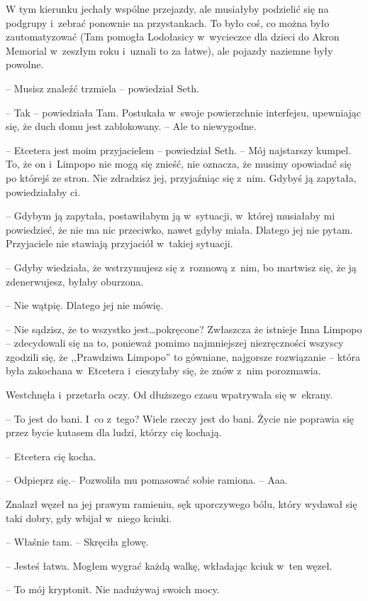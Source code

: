 \documentclass[oneside,polish,11pt,sfheadings]{mwbk}
\begin{document}
W tym kierunku jechały wspólne przejazdy, ale musiałyby podzielić się na
podgrupy i~zebrać ponownie na przystankach. To było coś, co można było
zautomatyzować (Tam pomogła Lodołasicy w~wycieczce dla dzieci do Akron
Memorial w~zeszłym roku i~uznali to za łatwe), ale pojazdy naziemne były
powolne.

-- Musisz znaleźć trzmiela -- powiedział Seth.

-- Tak -- powiedziała Tam. Postukała w~swoje powierzchnie interfejsu,
upewniając się, że duch domu jest zablokowany. -- Ale to niewygodne.

-- Etcetera jest moim przyjacielem -- powiedział Seth. -- Mój najstarszy
kumpel. To, że on i~Limpopo nie mogą się znieść, nie oznacza, że musimy
opowiadać się po którejś ze stron. Nie zdradzisz jej, przyjaźniąc się z~nim. Gdybyś ją zapytała, powiedziałaby ci.

-- Gdybym ją zapytała, postawiłabym ją w~sytuacji, w~której musiałaby mi
powiedzieć, że nie ma nic przeciwko, nawet gdyby miała. Dlatego jej nie
pytam. Przyjaciele nie stawiają przyjaciół w~takiej sytuacji.

-- Gdyby wiedziała, że wstrzymujesz się z~rozmową z~nim, bo martwisz się,
że ją zdenerwujesz, byłaby oburzona.

-- Nie wątpię. Dlatego jej nie mówię.

-- Nie sądzisz, że to wszystko jest\ldots  pokręcone? Zwłaszcza że istnieje
Inna Limpopo -- zdecydowali się na to, ponieważ pomimo najmniejszej
niezręczności wszyscy zgodzili się, że ,,Prawdziwa Limpopo'' to
gówniane, najgorsze rozwiązanie -- która była zakochana w~Etcetera i~cieszyłaby się, że znów z~nim porozmawia.

Westchnęła i~przetarła oczy. Od dłuższego czasu wpatrywała się w~ekrany.

-- To jest do bani. I~co z~tego? Wiele rzeczy jest do bani. Życie nie
poprawia się przez bycie kutasem dla ludzi, którzy cię kochają.

-- Etcetera cię kocha.

-- Odpieprz się.-- Pozwoliła mu pomasować sobie ramiona. -- Aaa.

Znalazł
węzeł na jej prawym ramieniu, sęk uporczywego bólu, który wydawał się
taki dobry, gdy wbijał w~niego kciuki.

-- Właśnie tam. -- Skręciła głowę.

-- Jesteś łatwa. Mogłem wygrać każdą walkę, wkładając kciuk w~ten węzeł.

-- To mój kryptonit. Nie nadużywaj swoich mocy.
\end{document}
